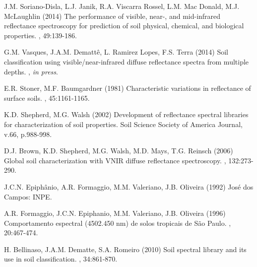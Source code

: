 \begin{footnotesize}
\begin{thebibliography}{99}
J.M. Soriano-Disla, L.J. Janik, R.A. Viscarra Rossel, L.M. Mac Donald, M.J. McLaughlin (2014)
\newblock The performance of visible, near-, and mid-infrared reflectance spectroscopy for prediction of soil physical, chemical, and biological properties.
, 49:139-186.

G.M. Vasques, J.A.M. Demattê, L. Ramirez Lopes, F.S. Terra (2014)
\newblock Soil classification using visible/near-infrared diffuse reflectance spectra from multiple depths.
, \textit{in press}.

E.R. Stoner, M.F. Baumgardner (1981)
\newblock Characteristic variations in reflectance of surface soils.
, 45:1161-1165.

K.D. Shepherd, M.G. Walsh (2002)
Development of reflectance spectral libraries for characterization of soil properties. Soil Science Society of America Journal, v.66, p.988-998.

D.J. Brown, K.D. Shepherd, M.G. Walsh, M.D. Mays, T.G. Reinsch (2006)
\newblock Global soil characterization with VNIR diffuse reflectance spectroscopy.
, 132:273-290.

J.C.N. Epiphânio, A.R. Formaggio, M.M. Valeriano, J.B. Oliveira (1992)
\newblock José dos Campos: INPE.

A.R. Formaggio, J.C.N. Epiphanio, M.M. Valeriano, J.B. Oliveira (1996)
\newblock Comportamento espectral (4502.450 nm) de solos tropicais de São Paulo.
, 20:467-474.

H. Bellinaso, J.A.M. Dematte, S.A. Romeiro (2010)
\newblock Soil spectral library and its use in soil classification.
, 34:861-870.


\end{thebibliography}
\end{footnotesize}
